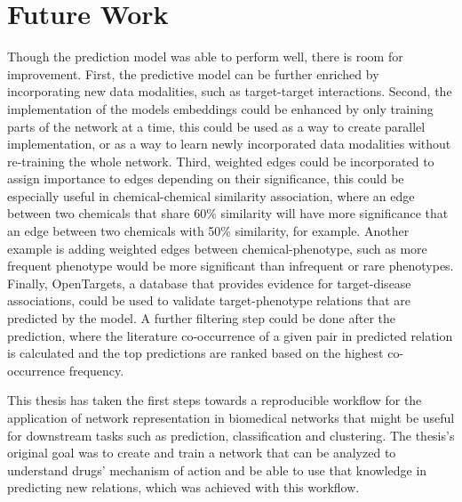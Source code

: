 \section{Future Work}
Though the prediction model was able to perform well, there is room for improvement.
First, the predictive model can be further enriched by incorporating new data modalities, such as target-target interactions.
Second, the implementation of the models embeddings could be enhanced by only training parts of the network at a time, this could be used as a way to create parallel implementation, or as a way to learn newly incorporated data modalities without re-training the whole network.
Third, weighted edges could be incorporated to assign importance to edges depending on their significance, this could be especially useful in chemical-chemical similarity association, where an edge between two chemicals that share 60\% similarity will have more significance that an edge between two chemicals with 50\% similarity, for example. Another example is adding weighted edges between chemical-phenotype, such as more frequent phenotype would be more significant than infrequent or rare phenotypes.
Finally, OpenTargets, a database that provides evidence for target-disease associations, could be used to validate target-phenotype relations that are predicted by the model. A further filtering step could be done after the prediction, where the literature co-occurrence of a given pair in predicted relation is calculated and the top predictions are ranked based on the highest co-occurrence frequency.

This thesis has taken the first steps towards a reproducible workflow for the application of network representation in biomedical networks that might be useful for downstream tasks such as prediction, classification and clustering. The thesis’s original goal was to create and train a network that can be analyzed to understand drugs’ mechanism of action and be able to use that knowledge in predicting new relations, which was achieved with this workflow. 
